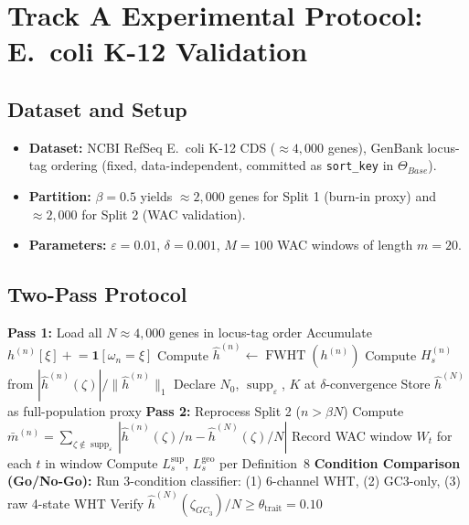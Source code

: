 \documentclass[12pt,letterpaper]{article}
\theoremstyle{definition}
\theoremstyle{plain}
\theoremstyle{remark}
\newcommand{\supp}{\operatorname{supp}}
\newcommand{\FWHT}{\operatorname{FWHT}}
\newcommand{\Tbase}{\Theta_{Base}}
\newcommand{\hhat}{\hat{h}}
\newcommand{\mbar}{\bar{m}}
\newcommand{\Lsup}{L_s^{\sup}}
\newcommand{\Lgeo}{L_s^{\mathrm{geo}}}
\begin{document}
\section{Track A Experimental Protocol: E.\ coli K-12 Validation}

\subsection{Dataset and Setup}

\begin{itemize}
  \item \textbf{Dataset:} NCBI RefSeq E.\ coli K-12 CDS ($\approx 4{,}000$ genes), GenBank locus-tag ordering (fixed, data-independent, committed as \texttt{sort\_key} in $\Tbase$).
  \item \textbf{Partition:} $\beta = 0.5$ yields $\approx 2{,}000$ genes for Split 1 (burn-in proxy) and $\approx 2{,}000$ for Split 2 (WAC validation).
  \item \textbf{Parameters:} $\varepsilon = 0.01$, $\delta = 0.001$, $M = 100$ WAC windows of length $m = 20$.
\end{itemize}

\subsection{Two-Pass Protocol}

\begin{algorithm}
\caption{Track A Two-Pass Protocol}
\begin{algorithmic}[1]
\State \textbf{Pass 1:} Load all $N \approx 4{,}000$ genes in locus-tag order
  \State Accumulate $h^{(n)}[\xi] \mathrel{+}= \mathbf{1}[\omega_n = \xi]$
  \State Compute $\hhat^{(n)} \leftarrow \FWHT(h^{(n)})$
  \State Compute $H_s^{(n)}$ from $|\hhat^{(n)}(\zeta)|/\|\hhat^{(n)}\|_1$
\EndFor
\State Declare $N_0$, $\supp_\varepsilon$, $K$ at $\delta$-convergence
\State Store $\hhat^{(N)}$ as full-population proxy
\State \textbf{Pass 2:} Reprocess Split 2 ($n > \beta N$)
  \State Compute $\mbar^{(n)} = \sum_{\zeta \notin \supp_\varepsilon} |{\hhat^{(n)}(\zeta)}/{n} - {\hhat^{(N)}(\zeta)}/{N}|$
  \State Record WAC window $W_t$ for each $t$ in window
\EndFor
\State Compute $\Lsup$, $\Lgeo$ per Definition~8
\State \textbf{Condition Comparison (Go/No-Go):}
\State Run 3-condition classifier: (1) 6-channel WHT, (2) GC3-only, (3) raw 4-state WHT
\State Verify $\hhat^{(N)}(\zeta_{GC_3})/N \ge \theta_{\mathrm{trait}} = 0.10$
\end{algorithmic}
\end{algorithm}
\end{document}
